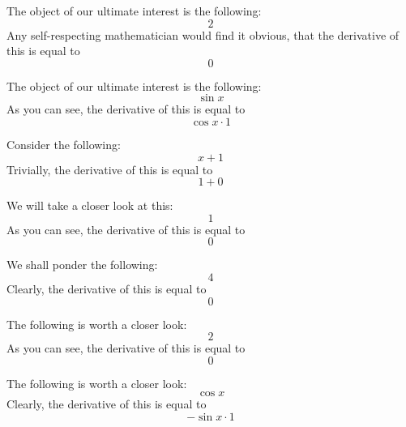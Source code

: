 \documentclass{article}
\begin{document}
The object of our ultimate interest is the following:
\begin{equation}
2 
\end{equation}
Any self-respecting mathematician would find it obvious, that the derivative of this is equal to
\begin{equation}
0 
\end{equation}

The object of our ultimate interest is the following:
\begin{equation}
\sin x 
\end{equation}
As you can see, the derivative of this is equal to
\begin{equation}
\cos x \cdot 1 
\end{equation}

Consider the following:
\begin{equation}
x + 1 
\end{equation}
Trivially, the derivative of this is equal to
\begin{equation}
1 + 0 
\end{equation}

We will take a closer look at this:
\begin{equation}
1 
\end{equation}
As you can see, the derivative of this is equal to
\begin{equation}
0 
\end{equation}

We shall ponder the following:
\begin{equation}
4 
\end{equation}
Clearly, the derivative of this is equal to
\begin{equation}
0 
\end{equation}

The following is worth a closer look:
\begin{equation}
2 
\end{equation}
As you can see, the derivative of this is equal to
\begin{equation}
0 
\end{equation}

The following is worth a closer look:
\begin{equation}
\cos x 
\end{equation}
Clearly, the derivative of this is equal to
\begin{equation}
-\sin x \cdot 1 
\end{equation}
\end{document}
